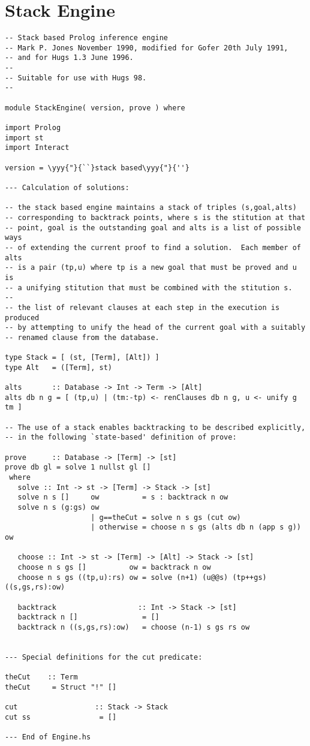 \documentclass[thesis-solanki.tex]{files}
\begin{document}
\section{Stack Engine}
\begin{verbatim}
-- Stack based Prolog inference engine
-- Mark P. Jones November 1990, modified for Gofer 20th July 1991,
-- and for Hugs 1.3 June 1996.
--
-- Suitable for use with Hugs 98.
--

module StackEngine( version, prove ) where

import Prolog
import st
import Interact

version = \yyy{"}{``}stack based\yyy{"}{''}

--- Calculation of solutions:

-- the stack based engine maintains a stack of triples (s,goal,alts)
-- corresponding to backtrack points, where s is the stitution at that
-- point, goal is the outstanding goal and alts is a list of possible ways
-- of extending the current proof to find a solution.  Each member of alts
-- is a pair (tp,u) where tp is a new goal that must be proved and u is
-- a unifying stitution that must be combined with the stitution s.
--
-- the list of relevant clauses at each step in the execution is produced
-- by attempting to unify the head of the current goal with a suitably
-- renamed clause from the database.

type Stack = [ (st, [Term], [Alt]) ]
type Alt   = ([Term], st)

alts       :: Database -> Int -> Term -> [Alt]
alts db n g = [ (tp,u) | (tm:-tp) <- renClauses db n g, u <- unify g tm ]
      
-- The use of a stack enables backtracking to be described explicitly,
-- in the following `state-based' definition of prove:

prove      :: Database -> [Term] -> [st]
prove db gl = solve 1 nullst gl []
 where
   solve :: Int -> st -> [Term] -> Stack -> [st]
   solve n s []     ow          = s : backtrack n ow
   solve n s (g:gs) ow
                    | g==theCut = solve n s gs (cut ow)
                    | otherwise = choose n s gs (alts db n (app s g)) ow

   choose :: Int -> st -> [Term] -> [Alt] -> Stack -> [st]
   choose n s gs []          ow = backtrack n ow
   choose n s gs ((tp,u):rs) ow = solve (n+1) (u@@s) (tp++gs) ((s,gs,rs):ow)

   backtrack                   :: Int -> Stack -> [st]
   backtrack n []               = []
   backtrack n ((s,gs,rs):ow)   = choose (n-1) s gs rs ow


--- Special definitions for the cut predicate:

theCut    :: Term
theCut     = Struct "!" []

cut                  :: Stack -> Stack
cut ss                = []

--- End of Engine.hs
\end{verbatim}
\end{document}
